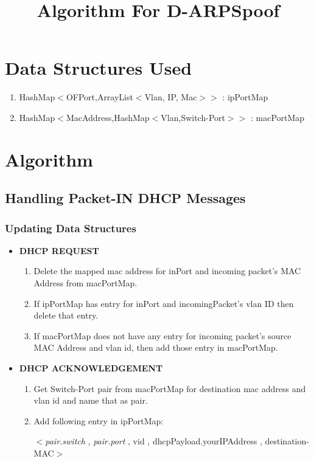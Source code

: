 \documentclass{article}
\title{Algorithm For D-ARPSpoof}
\renewcommand{\maketitle}{

	\begin{center}
		{\huge\noindent\ignorespaces\textbf{\thetitle}\par}
	\end{center}
	\vspace{0.3in}
	
}
\begin{document}
\maketitle
\section{Data Structures Used}

\begin{enumerate}
	\item HashMap$<$OFPort,ArrayList$<$Vlan, IP, Mac$>$$>$ : ipPortMap
	\item HashMap$<$MacAddress,HashMap$<$Vlan,Switch-Port$>$$>$ : macPortMap
\end{enumerate}

\section{Algorithm}


\subsection{Handling Packet-IN DHCP Messages}


\subsubsection{Updating Data Structures} \label{dhcp-ds}


\begin{itemize}
	\item \textbf{DHCP REQUEST}

		\begin{enumerate}
			\item Delete the mapped mac address for inPort and incoming packet's MAC Address from macPortMap.
			\item If ipPortMap has entry for inPort and incomingPacket's vlan ID then delete that entry.
			\item If macPortMap does not have any entry for incoming packet's source MAC Address and vlan id, then add those entry in macPortMap.
		\end{enumerate}
	\item \textbf{DHCP ACKNOWLEDGEMENT} \label{dhcp-ack}
		\begin{enumerate}
			\item Get Switch-Port pair from macPortMap for destination mac address and vlan id and name that as pair.
			\item Add following entry in ipPortMap:

				\small{
					$<$\textit{pair.switch} ,  \textit{pair.port} , vid , dhcpPayload.yourIPAddress , destination-MAC$>$
				}
		\end{enumerate}

\end{itemize}
\end{document}
